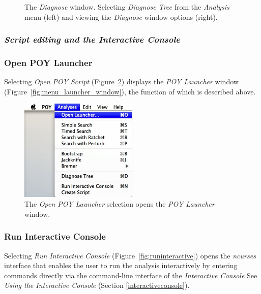 {\begin{figure}[ht]
\begin{minipage}[c]{0.52\textwidth}
\end{minipage}
\caption{The \emph{Diagnose} window. Selecting \emph{Diagnose Tree} 
from the \emph{Analysis} menu (left) and viewing the \emph{Diagnose} 
window options (right).}
\label{fig:diagnosetree}
\end{figure}

\subsubsection{\emph{Script editing and the Interactive Console}}

\subsubsection*{Open POY Launcher}

Selecting \emph{Open POY Script} (Figure~\ref{fig:open_poy_launcher}) 
displays the \emph{POY Launcher} window (Figure~\ref{fig:menu_launcher_window}), 
the function of which is described above.

\begin{figure}[htpb]
\begin{center}
\includegraphics[width=0.5\textwidth]{doc/figures/openpoylauncher_menu.jpg}
\end{center}
\caption{The \emph{Open POY Launcher} selection opens the \emph{POY 
Launcher} window.}
\label{fig:open_poy_launcher}
\end{figure}

\subsubsection*{Run Interactive Console}

Selecting \emph{Run Interactive Console} (Figure~\ref{fig:runinteractive}) 
opens the \emph{ncurses} interface that enables the user to run the analysis 
interactively by entering \poy commands directly via the command-line 
interface of the \emph{Interactive Console} See \emph{Using the 
Interactive Console} (Section \ref{interactiveconsole}).

}
